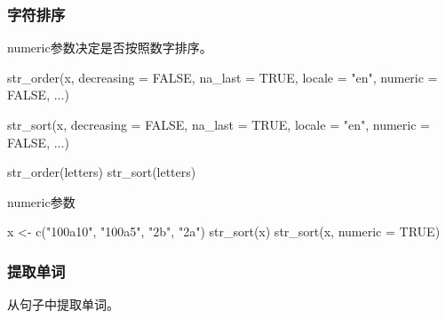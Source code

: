 \documentclass[
]{book}
\newenvironment{Shaded}{\begin{snugshade}}{\end{snugshade}}
\newcommand{\AttributeTok}[1]{\textcolor[rgb]{0.77,0.63,0.00}{#1}}
\newcommand{\ConstantTok}[1]{\textcolor[rgb]{0.00,0.00,0.00}{#1}}
\newcommand{\FunctionTok}[1]{\textcolor[rgb]{0.00,0.00,0.00}{#1}}
\newcommand{\NormalTok}[1]{#1}
\newcommand{\OtherTok}[1]{\textcolor[rgb]{0.56,0.35,0.01}{#1}}
\newcommand{\StringTok}[1]{\textcolor[rgb]{0.31,0.60,0.02}{#1}}
\begin{document}
\hypertarget{ux5b57ux7b26ux6392ux5e8f}{%
\subsubsection{字符排序}\label{ux5b57ux7b26ux6392ux5e8f}}

numeric参数决定是否按照数字排序。

\begin{Shaded}
\begin{Highlighting}[]
\FunctionTok{str\_order}\NormalTok{(x, }\AttributeTok{decreasing =} \ConstantTok{FALSE}\NormalTok{, }\AttributeTok{na\_last =} \ConstantTok{TRUE}\NormalTok{, }\AttributeTok{locale =} \StringTok{"en"}\NormalTok{,}
  \AttributeTok{numeric =} \ConstantTok{FALSE}\NormalTok{, ...)}

\FunctionTok{str\_sort}\NormalTok{(x, }\AttributeTok{decreasing =} \ConstantTok{FALSE}\NormalTok{, }\AttributeTok{na\_last =} \ConstantTok{TRUE}\NormalTok{, }\AttributeTok{locale =} \StringTok{"en"}\NormalTok{,}
  \AttributeTok{numeric =} \ConstantTok{FALSE}\NormalTok{, ...)}
\end{Highlighting}
\end{Shaded}

\begin{Shaded}
\begin{Highlighting}[]
\FunctionTok{str\_order}\NormalTok{(letters)}
\FunctionTok{str\_sort}\NormalTok{(letters)}
\end{Highlighting}
\end{Shaded}

numeric参数

\begin{Shaded}
\begin{Highlighting}[]
\NormalTok{x }\OtherTok{\textless{}{-}} \FunctionTok{c}\NormalTok{(}\StringTok{"100a10"}\NormalTok{, }\StringTok{"100a5"}\NormalTok{, }\StringTok{"2b"}\NormalTok{, }\StringTok{"2a"}\NormalTok{)}
\FunctionTok{str\_sort}\NormalTok{(x)}
\FunctionTok{str\_sort}\NormalTok{(x, }\AttributeTok{numeric =} \ConstantTok{TRUE}\NormalTok{)}
\end{Highlighting}
\end{Shaded}

\hypertarget{ux63d0ux53d6ux5355ux8bcd}{%
\subsubsection{提取单词}\label{ux63d0ux53d6ux5355ux8bcd}}

从句子中提取单词。
\end{document}
